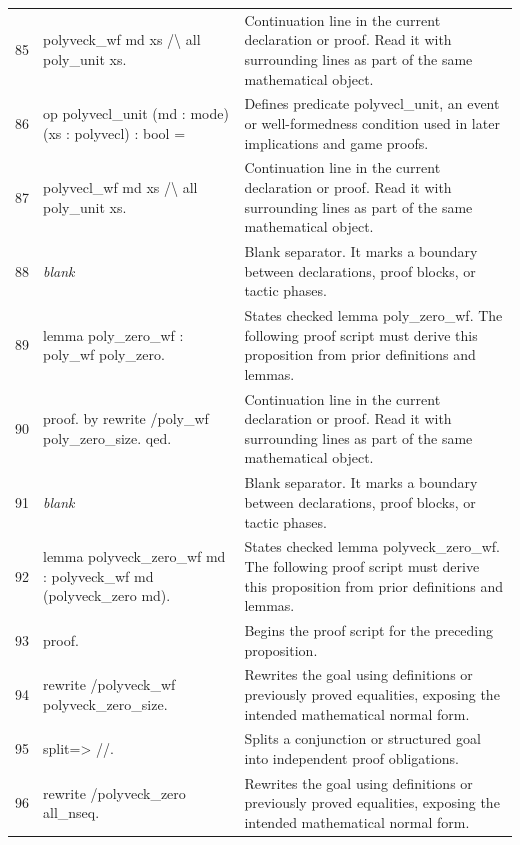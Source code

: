 \documentclass[10pt]{article}
\begin{document}
\begin{longtable}{r L{0.53\textwidth} L{0.37\textwidth}}
85 & {\ttfamily\scriptsize   polyveck\_wf md xs /\textbackslash{} all poly\_unit xs.} & Continuation line in the current declaration or proof.  Read it with surrounding lines as part of the same mathematical object. \\
86 & {\ttfamily\scriptsize op polyvecl\_unit (md : mode) (xs : polyvecl) : bool =} & Defines predicate polyvecl\_unit, an event or well-formedness condition used in later implications and game proofs. \\
87 & {\ttfamily\scriptsize   polyvecl\_wf md xs /\textbackslash{} all poly\_unit xs.} & Continuation line in the current declaration or proof.  Read it with surrounding lines as part of the same mathematical object. \\
88 & {\ttfamily\scriptsize \emph{blank}} & Blank separator.  It marks a boundary between declarations, proof blocks, or tactic phases. \\
89 & {\ttfamily\scriptsize lemma poly\_zero\_wf : poly\_wf poly\_zero.} & States checked lemma poly\_zero\_wf.  The following proof script must derive this proposition from prior definitions and lemmas. \\
90 & {\ttfamily\scriptsize proof. by rewrite /poly\_wf poly\_zero\_size. qed.} & Continuation line in the current declaration or proof.  Read it with surrounding lines as part of the same mathematical object. \\
91 & {\ttfamily\scriptsize \emph{blank}} & Blank separator.  It marks a boundary between declarations, proof blocks, or tactic phases. \\
92 & {\ttfamily\scriptsize lemma polyveck\_zero\_wf md : polyveck\_wf md (polyveck\_zero md).} & States checked lemma polyveck\_zero\_wf.  The following proof script must derive this proposition from prior definitions and lemmas. \\
93 & {\ttfamily\scriptsize proof.} & Begins the proof script for the preceding proposition. \\
94 & {\ttfamily\scriptsize rewrite /polyveck\_wf polyveck\_zero\_size.} & Rewrites the goal using definitions or previously proved equalities, exposing the intended mathematical normal form. \\
95 & {\ttfamily\scriptsize split=> //.} & Splits a conjunction or structured goal into independent proof obligations. \\
96 & {\ttfamily\scriptsize rewrite /polyveck\_zero all\_nseq.} & Rewrites the goal using definitions or previously proved equalities, exposing the intended mathematical normal form. \\

\end{longtable}
\end{document}
